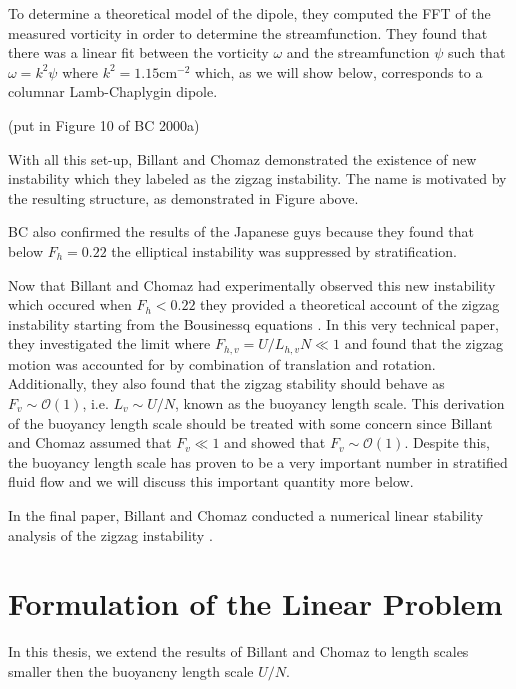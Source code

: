 To determine a theoretical model of the dipole, they computed the FFT of the measured vorticity in order to determine the streamfunction. They found that there was a linear fit between the vorticity $\omega$ and the streamfunction $\psi$ such that $\omega = k^{2}\psi$ where $k^{2}=1.15 \text{cm}^{-2}$  which, as we will show below, corresponds to a columnar Lamb-Chaplygin dipole.

(put in Figure 10 of BC 2000a)

With all this set-up, Billant and Chomaz demonstrated the existence of new instability which they labeled as the zigzag instability. The name is motivated by the resulting structure, as demonstrated in Figure above. 

BC also confirmed the results of the Japanese guys because they found that below $F_{h}=0.22$ the elliptical instability was suppressed by stratification. 

Now that Billant and Chomaz had experimentally observed this new instability which occured when $F_{h}<0.22$ they provided a theoretical account of the zigzag instability starting from the Bousinessq equations \cite{bc2000b}. In this very technical paper, they investigated the limit where $F_{h,v} = U/L_{h,v}N \ll 1$ and found that the zigzag motion was accounted for by combination of translation and rotation. Additionally, they also found that the zigzag stability should behave as $F_{v} \sim \mathcal{O}(1)$, i.e. $L_{v} \sim U/N$, known as the buoyancy length scale. This derivation of the buoyancy length scale should be treated with some concern since Billant and Chomaz assumed that $F_{v}\ll 1$ and showed that $F_{v}\sim \mathcal{O}(1)$. Despite this, the buoyancy length scale  has proven to be a very important number in stratified fluid flow and we will discuss this important quantity more below.

In the final paper, Billant and Chomaz conducted a numerical linear stability analysis of the zigzag instability \cite{bc2000c}.


\section{Formulation of the Linear Problem}
In this thesis, we extend the results of Billant and Chomaz \cite{bc2000c} to length scales smaller then the buoyancny length scale $U/N$. 

